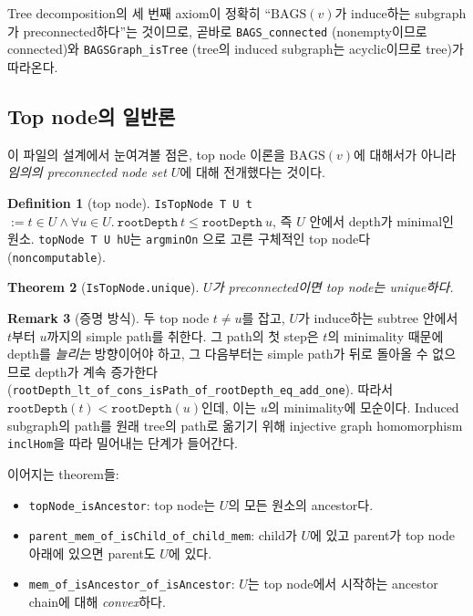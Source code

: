 \documentclass[11pt]{article}
\theoremstyle{definition}
\newtheorem{definition}{Definition}[section]
\newtheorem{remark}[definition]{Remark}
\theoremstyle{plain}
\newtheorem{theorem}[definition]{Theorem}
\newcommand{\lean}[1]{\texttt{#1}}
\begin{document}
Tree decomposition의 세 번째 axiom이 정확히 ``$\mathrm{BAGS}(v)$가 induce하는
subgraph가 preconnected하다''는 것이므로, 곧바로 \lean{BAGS\_connected}
(nonempty이므로 connected)와 \lean{BAGSGraph\_isTree} (tree의 induced subgraph는
acyclic이므로 tree)가 따라온다.

\subsection{Top node의 일반론}

이 파일의 설계에서 눈여겨볼 점은, top node 이론을 $\mathrm{BAGS}(v)$에
대해서가 아니라 \emph{임의의 preconnected node set $U$}에 대해 전개했다는
것이다.

\begin{definition}[top node]
\label{basics:def:topnode}
\lean{IsTopNode T U t} $:= t \in U \land \forall u \in U.\ \lean{rootDepth}\ t \le \lean{rootDepth}\ u$,
즉 $U$ 안에서 depth가 minimal인 원소. \lean{topNode T U hU}는 \lean{argminOn}
으로 고른 구체적인 top node다 (\lean{noncomputable}).
\end{definition}

\begin{theorem}[\lean{IsTopNode.unique}]
\label{basics:thm:topunique}
$U$가 preconnected이면 top node는 unique하다.
\end{theorem}

\begin{remark}[증명 방식]
두 top node $t \ne u$를 잡고, $U$가 induce하는 subtree 안에서 $t$부터 $u$까지의
simple path를 취한다. 그 path의 첫 step은 $t$의 minimality 때문에 depth를
\emph{늘리는} 방향이어야 하고, 그 다음부터는 simple path가 뒤로 돌아올 수
없으므로 depth가 계속 증가한다
(\lean{rootDepth\_lt\_of\_cons\_isPath\_of\_rootDepth\_eq\_add\_one}).
따라서 $\lean{rootDepth}(t) < \lean{rootDepth}(u)$인데, 이는 $u$의 minimality에
모순이다. Induced subgraph의 path를 원래 tree의 path로 옮기기 위해
injective graph homomorphism \lean{inclHom}을 따라 밀어내는 단계가 들어간다.
\end{remark}

이어지는 theorem들:
\begin{itemize}
  \item \lean{topNode\_isAncestor}: top node는 $U$의 모든 원소의 ancestor다.
  \item \lean{parent\_mem\_of\_isChild\_of\_child\_mem}: child가 $U$에 있고
    parent가 top node 아래에 있으면 parent도 $U$에 있다.
  \item \lean{mem\_of\_isAncestor\_of\_isAncestor}: $U$는 top node에서
    시작하는 ancestor chain에 대해 \emph{convex}하다.
\end{itemize}
\end{document}
